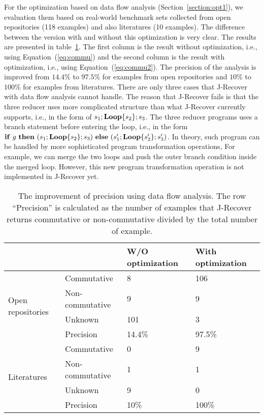 \documentclass{llncs}
\newcommand{\ite}[3]{
	 \ifmmode 
	 \mathbf{if}\ #1 \ \mathbf{then}\ #2\  \mathbf{else}\ #3 
	 \else
	 \textbf{if}\ #1 \ \textbf{then}\ #2\  \textbf{else}\ #3
	 \fi}
\newcommand{\rloop}{
	\ifmmode 
	\mathbf{Loop}
	\else
	\textbf{Loop}
	\fi}
\begin{document}
For the optimization based on data flow analysis (Section~\ref{section:opt1}), we evaluation them based on real-world benchmark sets collected from open repositories (118 examples) and also literatures (10 examples). The difference between the version with and without this optimization is very clear. The results are presented in table~\ref{tab:opt1}. The first column is the result without optimization, i.e., using Equation~(\ref{eq:commu}) and the second column is the result with optimization, i.e., using Equation~(\ref{eq:commu2}). The precision of the analysis is improved from $14.4\%$ to $97.5\%$ for examples from open repositories and
$10\%$ to $100\%$ for examples from literatures. There are only three cases that J-Recover with data flow analysis cannot handle. The reason that J-Recover fails is that the three reducer uses more complicated structure than what J-Recover currently supports, i.e., in the form of $s_1;\rloop\{s_2\};s_3$. The three reducer programs uses a branch statement before entering the loop, i.e., in the form $\ite{g}{(s_1;\rloop\{s_2\};s_3)}{(s'_1;\rloop\{s'_2\};s'_3)}$. In theory, such program can be handled by more sophisticated program transformation operations, For example, we can merge the two loops and push the outer branch condition inside the merged loop. 
However, this new program transformation operation is not implemented in J-Recover yet.

\begin{table}[htb]
	\centering
	\begin{tabular}{|l|l|l|l|}
		\hline
		& &W/O optimization	& With optimization\\
		\hline
		\hline
		\multirow{4}{*}{Open repositories}&Commutative& 8&106\\ 
		\cline{2-4}
		&Non-commutative&9&9\\
		\cline{2-4}
		&Unknown&101&3\\
		\cline{2-4}
		&Precision& 14.4\% & 97.5\%\\
		\hline
		\hline
		\multirow{4}{*}{Literatures}&Commutative& 0&9\\
		\cline{2-4}
		&Non-commutative&1&1\\
		\cline{2-4}
		&Unknown&9&0\\
		\cline{2-4}
		&Precision& 10\% & 100\%\\
		\hline
	\end{tabular}
	\caption{The improvement of precision using data flow analysis. The row ``Precision'' is calculated as the number of examples that J-Recover returns commutative or non-commutative divided by the total number of example.}
	\label{tab:opt1}
\end{table}
\end{document}
